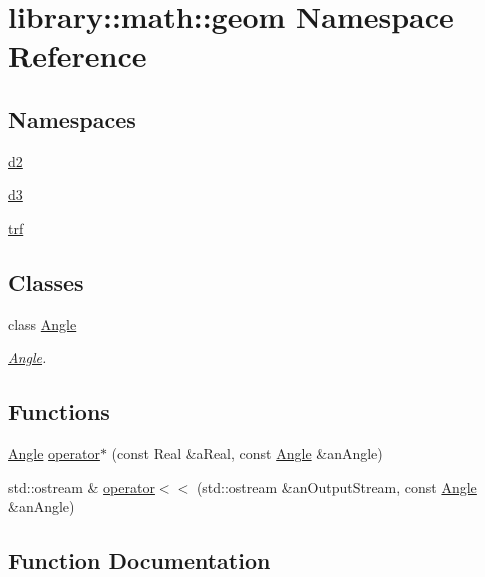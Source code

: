 \hypertarget{namespacelibrary_1_1math_1_1geom}{}\section{library\+:\+:math\+:\+:geom Namespace Reference}
\label{namespacelibrary_1_1math_1_1geom}
\subsection*{Namespaces}
\begin{DoxyCompactItemize}
\item 
 \hyperlink{namespacelibrary_1_1math_1_1geom_1_1d2}{d2}
\item 
 \hyperlink{namespacelibrary_1_1math_1_1geom_1_1d3}{d3}
\item 
 \hyperlink{namespacelibrary_1_1math_1_1geom_1_1trf}{trf}
\end{DoxyCompactItemize}
\subsection*{Classes}
\begin{DoxyCompactItemize}
\item 
class \hyperlink{classlibrary_1_1math_1_1geom_1_1_angle}{Angle}
\begin{DoxyCompactList}\small\item\em \hyperlink{classlibrary_1_1math_1_1geom_1_1_angle}{Angle}. \end{DoxyCompactList}\end{DoxyCompactItemize}
\subsection*{Functions}
\begin{DoxyCompactItemize}
\item 
\hyperlink{classlibrary_1_1math_1_1geom_1_1_angle}{Angle} \hyperlink{namespacelibrary_1_1math_1_1geom_a7f77c4f8d55dbd419a7a9b19aba9a00d}{operator$\ast$} (const Real \&a\+Real, const \hyperlink{classlibrary_1_1math_1_1geom_1_1_angle}{Angle} \&an\+Angle)
\item 
std\+::ostream \& \hyperlink{namespacelibrary_1_1math_1_1geom_adeb31e2f219ef8195271d7655dedd3b8}{operator$<$$<$} (std\+::ostream \&an\+Output\+Stream, const \hyperlink{classlibrary_1_1math_1_1geom_1_1_angle}{Angle} \&an\+Angle)
\end{DoxyCompactItemize}


\subsection{Function Documentation}
\mbox{\label{namespacelibrary_1_1math_1_1geom_a7f77c4f8d55dbd419a7a9b19aba9a00d}} 
